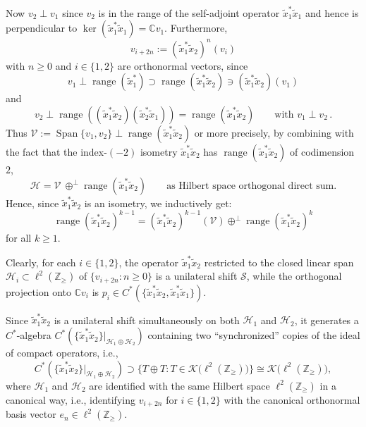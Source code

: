 \documentclass[pdftex]{sigma}
\begin{document}
Now $v_{2}\perp v_{1}$ since $v_{2}$ is in the range of the self-adjoint
operator $\tilde{x}_{1}^{\ast}\tilde{x}_{1}$ and hence is perpendicular to
$\ker( \tilde{x}_{1}^{\ast}\tilde{x}_{1}) =\mathbb{C}v_{1}$.
Furthermore,
\[
v_{i+2n}:=( \tilde{x}_{1}^{\ast}\tilde{x}_{2}) ^{n}(v_{i})
\]
with $n\geq0$ and $i\in\{ 1,2\} $ are orthonormal vectors, since
\[
v_{1}\perp\operatorname{range}( \tilde{x}_{1}^{\ast})
\supset\operatorname{range}( \tilde{x}_{1}^{\ast}\tilde{x}_{2})
\ni( \tilde{x}_{1}^{\ast}\tilde{x}_{2}) ( v_{1})
\]
and
\[
v_{2}\perp\operatorname{range}(( \tilde{x}_{1}^{\ast}\tilde
{x}_{2}) ( \tilde{x}_{2}^{\ast}\tilde{x}_{1}))
=\operatorname{range}( \tilde{x}_{1}^{\ast}\tilde{x}_{2})
\qquad \text{with\ \ }v_{1}\perp v_{2}\, .
\]
Thus $\mathcal{V}:=\operatorname{Span}\{ v_{1},v_{2}\}
\perp\operatorname{range}( \tilde{x}_{1}^{\ast}\tilde{x}_{2}) $
or more precisely, by combining with the fact that the index-$(
-2) $ isometry $\tilde{x}_{1}^{\ast}\tilde{x}_{2}$ has
$\operatorname{range}( \tilde{x}_{1}^{\ast}\tilde{x}_{2}) $ of
codimension $2$,
\[
\mathcal{H}=\mathcal{V~}\oplus^{\perp}\operatorname{range}( \tilde
{x}_{1}^{\ast}\tilde{x}_{2}) \qquad \text{as Hilbert space orthogonal
direct sum.}
\]
Hence, since $\tilde{x}_{1}^{\ast}\tilde{x}_{2}$ is an isometry, we inductively get:
\[
\operatorname{range}( \tilde{x}_{1}^{\ast}\tilde{x}_{2})
^{k-1}=( \tilde{x}_{1}^{\ast}\tilde{x}_{2}) ^{k-1}(
\mathcal{V}) \oplus^{\perp}\operatorname{range}( \tilde{x}_{1}^{\ast}\tilde{x}_{2}) ^{k}
\]
for all $k\geq1$.

Clearly, for each $i\in\{ 1,2\} $, the operator $\tilde{x}
_{1}^{\ast}\tilde{x}_{2}$ restricted to the closed linear span $\mathcal{H}
_{i}\subset\ell^{2}( \mathbb{Z}_{\geq}) $ of $\{
v_{i+2n}\colon n\geq0\} $ is a unilateral shift $\mathcal{S}$, while the
orthogonal projection onto $\mathbb{C}v_{i}$ is $p_{i}\in C^{\ast}(
\{ \tilde{x}_{1}^{\ast}\tilde{x}_{2},\tilde{x}_{1}^{\ast}\tilde{x}%
_{1}\})$.

Since $\tilde{x}_{1}^{\ast}\tilde{x}_{2}$ is a unilateral shift simultaneously
on both $\mathcal{H}_{1}$ and $\mathcal{H}_{2}$, it generates a $C^*$-algebra
$C^{\ast}(\{ \tilde{x}_{1}^{\ast}\tilde{x}_{2}\}
|_{\mathcal{H}_{1}\oplus\mathcal{H}_{2}}) $ containing two
``synchronized'' copies of the ideal of
compact operators, i.e.,
\[
C^{\ast}( \{ \tilde{x}_{1}^{\ast}\tilde{x}_{2}\}
|_{\mathcal{H}_{1}\oplus\mathcal{H}_{2}}) \supset\big\{ T\oplus
T\colon T\in\mathcal{K}\big( \ell^{2}( \mathbb{Z}_{\geq}) \big)
\big\} \cong\mathcal{K}\big( \ell^{2}( \mathbb{Z}_{\geq})\big),
\]
where $\mathcal{H}_{1}$ and $\mathcal{H}_{2}$ are identified with the same
Hilbert space $\ell^{2}( \mathbb{Z}_{\geq}) $ in a canonical way,
i.e., identifying $v_{i+2n}$ for $i\in\{ 1,2\} $ with the
canonical orthonormal basis vector $e_{n}\in\ell^{2}( \mathbb{Z}_{\geq
}) $.
\end{document}
